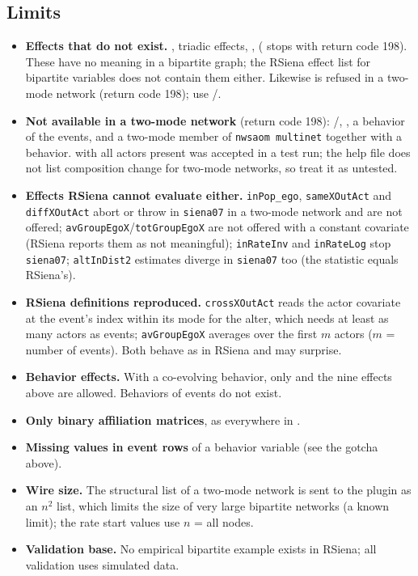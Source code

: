 \subsection{Limits}\label{sec:twomode-limits}

\begin{itemize}
\item \textbf{Effects that do not exist.} , triadic effects, ,  ( stops with return code 198). These have no meaning in a bipartite graph; the RSiena effect list for bipartite variables does not contain them either. Likewise  is refused in a two-mode network (return code 198); use /.
\item \textbf{Not available in a two-mode network} (return code 198): /, , a behavior of the events, and a two-mode member of \texttt{nwsaom multinet} together with a behavior.  with all actors present was accepted in a test run; the help file does not list composition change for two-mode networks, so treat it as untested.
\item \textbf{Effects RSiena cannot evaluate either.} \texttt{inPop\_ego}, \texttt{sameXOutAct} and \texttt{diffXOutAct} abort or throw in \texttt{siena07} in a two-mode network and are not offered; \texttt{avGroupEgoX}/\texttt{totGroupEgoX} are not offered with a constant covariate (RSiena reports them as not meaningful); \texttt{inRateInv} and \texttt{inRateLog} stop \texttt{siena07}; \texttt{altInDist2} estimates diverge in \texttt{siena07} too (the statistic equals RSiena's).
\item \textbf{RSiena definitions reproduced.} \texttt{crossXOutAct} reads the actor covariate at the event's index within its mode for the alter, which needs at least as many actors as events; \texttt{avGroupEgoX} averages over the first $m$ actors ($m$ = number of events). Both behave as in RSiena and may surprise.
\item \textbf{Behavior effects.} With a co-evolving behavior, only  and the nine  effects above are allowed. Behaviors of events do not exist.
\item \textbf{Only binary affiliation matrices}, as everywhere in \nwsaom{}.
\item \textbf{Missing values in event rows} of a behavior variable (see the gotcha above).
\item \textbf{Wire size.} The structural list of a two-mode network is sent to the plugin as an $n^2$ list, which limits the size of very large bipartite networks (a known limit); the rate start values use $n$ = all nodes.
\item \textbf{Validation base.} No empirical bipartite example exists in RSiena; all validation uses simulated data.
\end{itemize}

